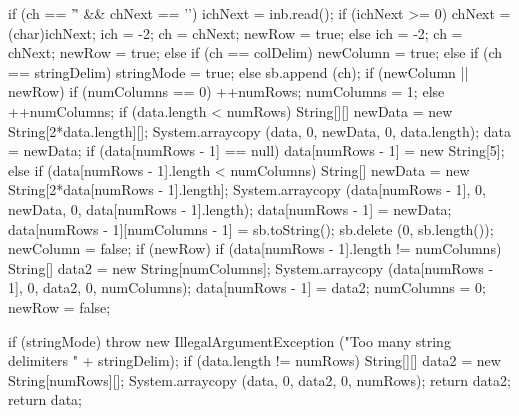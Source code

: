 \begin{code}
\begin{hide}
{{{{{{                    if (ch == '\r' && chNext == '\n') {
                       ichNext = inb.read();
                       if (ichNext >= 0) {
                          chNext = (char)ichNext;
                          ich = -2;
                          ch = chNext;
                          newRow = true;
                       }
                    }
                    else {
                       ich = -2;
                       ch = chNext;
                       newRow = true;
                    }
                 }
              }
              else if (ch == colDelim)
                 newColumn = true;
              else if (ch == stringDelim)
                 stringMode = true;
              else
                 sb.append (ch);
            }
         }
         if (newColumn || newRow) {
            if (numColumns == 0) {
               ++numRows;
               numColumns = 1;
            }
            else
               ++numColumns;
            if (data.length < numRows) {
               String[][] newData = new String[2*data.length][];
               System.arraycopy (data, 0, newData, 0, data.length);
               data = newData;
            }
            if (data[numRows - 1] == null)
               data[numRows - 1] = new String[5];
            else if (data[numRows - 1].length < numColumns) {
               String[] newData = new String[2*data[numRows - 1].length];
               System.arraycopy (data[numRows - 1], 0, newData, 0, data[numRows - 1].length);
               data[numRows - 1] = newData;
            }
            data[numRows - 1][numColumns - 1] = sb.toString();
            sb.delete (0, sb.length());
            newColumn = false;
         }
         if (newRow) {
            if (data[numRows - 1].length != numColumns) {
               String[] data2 = new String[numColumns];
               System.arraycopy (data[numRows - 1], 0, data2, 0, numColumns);
               data[numRows - 1] = data2;
            }
            numColumns = 0;
            newRow = false;
         }
      }

      if (stringMode)
         throw new IllegalArgumentException ("Too many string delimiters " + stringDelim);
      if (data.length != numRows) {
         String[][] data2 = new String[numRows][];
         System.arraycopy (data, 0, data2, 0, numRows);
         return data2;
      }
      return data;
   }\end{hide}
\end{code}
